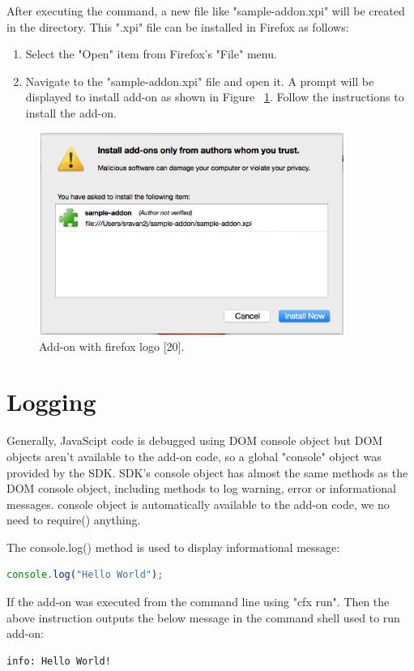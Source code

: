 After executing the command, a new file like "sample-addon.xpi" will be created in the directory. This ".xpi" file can be installed in Firefox as follows:
\begin{enumerate}
\item Select the "Open" item from Firefox's "File" menu.
\item Navigate to the "sample-addon.xpi" file and open it. A prompt will be displayed to install add-on as shown in Figure ~\ref{fig:install}. Follow the instructions to install the add-on.
\end{enumerate}

\begin{figure}[h]
  \centering
      \includegraphics[width=10cm, height=6.6cm]{install.png}
    \caption[Add-on with firefox logo]{Add-on with firefox logo [20].}
    \label{fig:install}
\end{figure}

\section{Logging}

Generally, JavaScipt code is debugged using DOM console object but DOM objects aren't available to the add-on code, so a global "console" object was provided by the SDK. SDK's console object has almost the same methods as the DOM console object, including methods to log warning, error or informational messages. console object is automatically available to the add-on code, we no need to require() anything.

The console.log() method is used to display informational message:
\begin{lstlisting}[frame=none,numbers=none,language=JavaScript]
console.log("Hello World");
\end{lstlisting}
If the add-on was executed from the command line using "cfx run". Then the above instruction outputs the below message in the command shell used to run add-on:
\begin{lstlisting}[frame=none,numbers=none]
info: Hello World!
\end{lstlisting}
